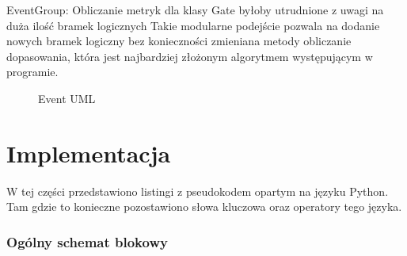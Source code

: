 EventGroup:
Obliczanie metryk dla klasy Gate byłoby utrudnione z uwagi na duża ilość bramek logicznych 
Takie modularne podejście pozwala na dodanie nowych bramek logiczny bez konieczności zmieniana metody obliczanie dopasowania, która jest najbardziej złożonym algorytmem występującym w programie. 
\begin{figure}[h]
	\caption{\label{fig:subcaption_example}Event UML}
\end{figure}

\clearpage
\section{Implementacja}

W tej części przedstawiono listingi z pseudokodem opartym na języku Python. Tam gdzie to konieczne pozostawiono słowa kluczowa oraz operatory tego języka.

\subsubsection{Ogólny schemat blokowy}


